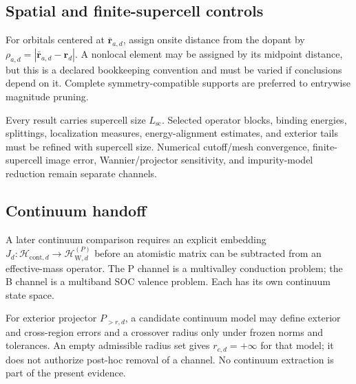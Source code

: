 \documentclass[11pt]{article}
\newenvironment{prospective}{\color{prospectivered}}{}
\begin{document}
\begin{prospective}
\subsection{Spatial and finite-supercell controls}
For orbitals centered at $\bar{\mathbf r}_{a,d}$, assign onsite distance from the dopant
by $\rho_{a,d}=|\bar{\mathbf r}_{a,d}-\mathbf r_d|$. A nonlocal element may be assigned
by its midpoint distance, but this is a declared bookkeeping convention and must be
varied if conclusions depend on it. Complete symmetry-compatible supports are preferred
to entrywise magnitude pruning.

Every result carries supercell size $L_{\mathrm{sc}}$. Selected operator blocks,
binding energies, splittings, localization measures, energy-alignment estimates, and
exterior tails must be refined with supercell size. Numerical cutoff/mesh convergence,
finite-supercell image error, Wannier/projector sensitivity, and impurity-model reduction
remain separate channels.

\subsection{Continuum handoff}
A later continuum comparison requires an explicit embedding
$J_d:\mathcal H_{\mathrm{cont},d}\rightarrow\mathcal H_{\mathrm W,d}^{(P)}$ before an
atomistic matrix can be subtracted from an effective-mass operator. The P channel is a
multivalley conduction problem; the B channel is a multiband SOC valence problem. Each
has its own continuum state space.

For exterior projector $P_{>r,d}$, a candidate continuum model may define exterior and
cross-region errors and a crossover radius only under frozen norms and tolerances. An
empty admissible radius set gives $r_{c,d}=+\infty$ for that model; it does not authorize
post-hoc removal of a channel. No continuum extraction is part of the present evidence.


\end{prospective}
\end{document}
